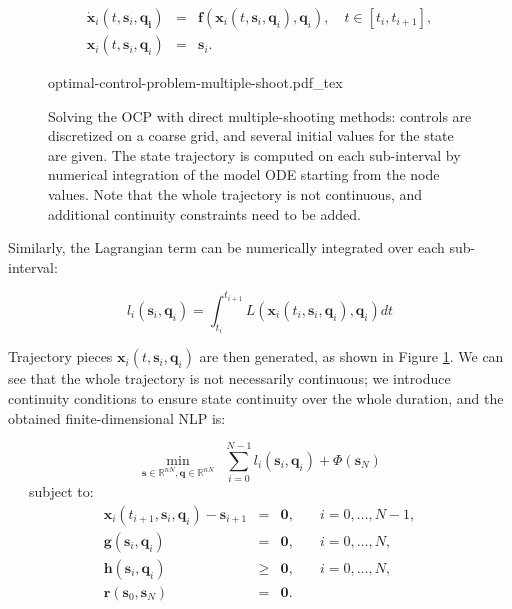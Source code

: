 \begin{equation}
\begin{array}{rcl}
\dot{\mathbf{x}}_i(t,\mathbf{s}_i,\mathbf{q_i}) &=&
\mathbf{f}(\mathbf{x}_i(t,\mathbf{s}_i,\mathbf{q}_i),\mathbf{q}_i),
\quad t\in\left[t_i,t_{i+1}\right], \\
\mathbf{x}_i(t,\mathbf{s}_i,\mathbf{q}_i) &=& \mathbf{s}_i.
\end{array}
\end{equation} 

\begin{figure}
  \centering
      {\def\svgwidth{0.9\linewidth}
        
                   {optimal-control-problem-multiple-shoot.pdf_tex}
      }
      \caption{Solving the OCP with direct multiple-shooting methods:
        controls are discretized on a coarse grid, and several initial
        values for the state are given. The state trajectory is
        computed on each sub-interval by numerical integration of the
        model ODE starting from the node values. Note that the whole
        trajectory is not continuous, and additional continuity
        constraints need to be added.}
      \label{fig:chap3-optimal-control-problem-multiple-shoot}
\end{figure}

Similarly, the Lagrangian term can be numerically integrated over each
sub-interval:

\begin{equation}
l_i(\mathbf{s}_i,\mathbf{q}_i) =
\int_{t_i}^{t_{i+1}}L(\mathbf{x}_i(t_i,\mathbf{s}_i,\mathbf{q}_i),\mathbf{q}_i)dt
\end{equation}

Trajectory pieces $\mathbf{x}_i(t,\mathbf{s}_i,\mathbf{q}_i)$ are then
generated, as shown in Figure
\ref{fig:chap3-optimal-control-problem-multiple-shoot}. We can see
that the whole trajectory is not necessarily continuous; we introduce
continuity conditions to ensure state continuity over the whole
duration, and the obtained finite-dimensional NLP is:

\begin{equation}
  \min_{\mathbf{s}\in\mathbb R^{nN},\mathbf{q}\in\mathbb R^{nN}}
  \ \ \sum_{i=0}^{N-1}l_i(\mathbf{s}_i,\mathbf{q}_i) +
  \Phi(\mathbf{s}_N)
\end{equation}
\ \ \ subject to:
\begin{equation}
  \begin{array}{rcll}
   \mathbf{x}_i(t_{i+1},\mathbf{s}_i,\mathbf{q}_i) - \mathbf{s}_{i+1} &
    = & \mathbf{0}, & \quad i=0,\ldots,N-1,\\%
    \mathbf{g}(\mathbf{s}_i,\mathbf{q}_i) & = & \mathbf{0}, & \quad i=0,\ldots,N,%
    \\%
    \mathbf{h}(\mathbf{s}_i,\mathbf{q}_i) & \ge & \mathbf{0}, & \quad i=0,\ldots,N,%
    \\%
    \mathbf{r} (\mathbf{s}_0,\mathbf{s}_N) & = & \mathbf{0}.%
    \\%
  \end{array}
\end{equation} 

